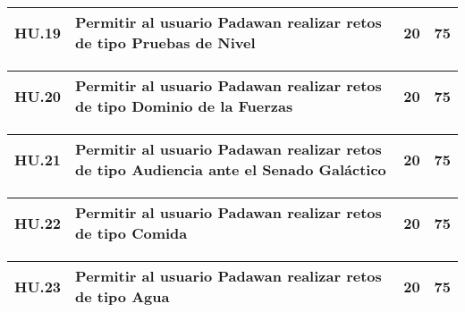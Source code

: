 \begin{table}[h]
	\centering
	\begin{tabular}{| p{2.3cm} | p{5.1cm} | p{2cm} | p{1.6cm} |}
		\hline 
		HU.19 & Permitir al usuario Padawan realizar retos de tipo Pruebas de Nivel & 20 & 75 \\ \hline 
	\end{tabular}
\end{table}   

\begin{table}[h]
	\centering
	\begin{tabular}{| p{2.3cm} | p{5.1cm} | p{2cm} | p{1.6cm} |}
		\hline 
		HU.20 & Permitir al usuario Padawan realizar retos de tipo Dominio de la Fuerzas & 20 & 75 \\ \hline 
	\end{tabular}
\end{table}   

\begin{table}[h]
	\centering
	\begin{tabular}{| p{2.3cm} | p{5.1cm} | p{2cm} | p{1.6cm} |}
		\hline 
		HU.21 & Permitir al usuario Padawan realizar retos de tipo Audiencia ante el Senado Galáctico & 20 & 75 \\ \hline 
	\end{tabular}
\end{table}

\begin{table}[h]
	\centering
	\begin{tabular}{| p{2.3cm} | p{5.1cm} | p{2cm} | p{1.6cm} |}
		\hline 
		HU.22 & Permitir al usuario Padawan realizar retos de tipo Comida & 20 & 75 \\ \hline 
	\end{tabular}
\end{table}

\begin{table}[h]
	\centering
	\begin{tabular}{| p{2.3cm} | p{5.1cm} | p{2cm} | p{1.6cm} |}
		\hline 
		HU.23 & Permitir al usuario Padawan realizar retos de tipo Agua & 20 & 75 \\ \hline 
	\end{tabular}
\end{table}

\FloatBarrier        
